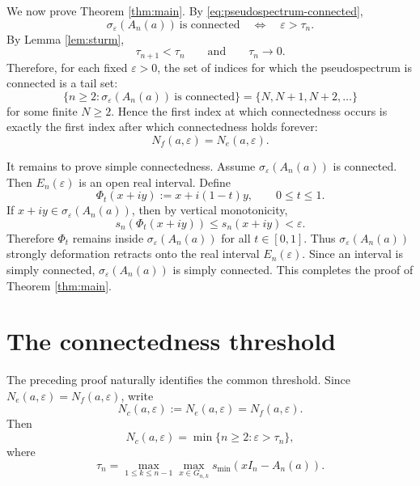 \documentclass[11pt]{amsart}
\numberwithin{equation}{section}
\newcommand{\eps}{\varepsilon}
\begin{document}
We now prove Theorem \ref{thm:main}.  By \eqref{eq:pseudospectrum-connected},
\begin{equation}\label{eq:connected-iff-tau}
\sigma_\eps(A_n(a))\ \text{is connected}
\quad\Longleftrightarrow\quad
\eps>\tau_n.
\end{equation}
By Lemma \ref{lem:sturm},
\begin{equation}\label{eq:tau-tail-properties}
\tau_{n+1}<\tau_n
\qquad\text{and}\qquad
\tau_n\to0.
\end{equation}
Therefore, for each fixed \(\eps>0\), the set of indices for which the pseudospectrum is connected is a tail set:
\begin{equation}\label{eq:connected-tail-set}
\{n\ge2:\sigma_\eps(A_n(a))\ \text{is connected}\}
=
\{N,N+1,N+2,\dots\}
\end{equation}
for some finite \(N\ge2\).  Hence the first index at which connectedness occurs is exactly the first index after which connectedness holds forever:
\begin{equation}\label{eq:threshold-equality}
N_f(a,\eps)=N_e(a,\eps).
\end{equation}

It remains to prove simple connectedness.  Assume \(\sigma_\eps(A_n(a))\) is connected.  Then \(E_n(\eps)\) is an open real interval.  Define
\begin{equation}\label{eq:vertical-retraction}
\Phi_t(x+iy):=x+i(1-t)y,
\qquad 0\le t\le1.
\end{equation}
If \(x+iy\in\sigma_\eps(A_n(a))\), then by vertical monotonicity,
\begin{equation}\label{eq:retraction-bound}
s_n(\Phi_t(x+iy))
\le
s_n(x+iy)
<
\eps.
\end{equation}
Therefore \(\Phi_t\) remains inside \(\sigma_\eps(A_n(a))\) for all \(t\in[0,1]\).  Thus \(\sigma_\eps(A_n(a))\) strongly deformation retracts onto the real interval \(E_n(\eps)\).  Since an interval is simply connected, \(\sigma_\eps(A_n(a))\) is simply connected.  This completes the proof of Theorem \ref{thm:main}.

\section{The connectedness threshold}

The preceding proof naturally identifies the common threshold.  Since \(N_e(a,\eps)=N_f(a,\eps)\), write
\[
N_c(a,\eps):=N_e(a,\eps)=N_f(a,\eps).
\]
Then
\begin{equation}\label{eq:threshold-formula}
N_c(a,\eps)
=
\min\{n\ge2:\eps>\tau_n\},
\end{equation}
where
\begin{equation}\label{eq:tau-formula}
\tau_n
=
\max_{1\le k\le n-1}
\max_{x\in G_{n,k}}
s_{\min}(xI_n-A_n(a)).
\end{equation}
\end{document}
